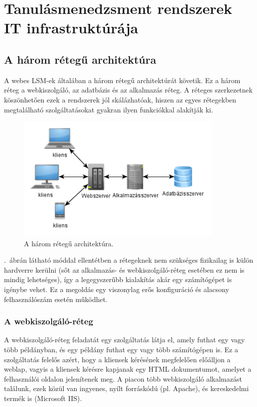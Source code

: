 \chapter{Tanulásmenedzsment rendszerek IT infrastruktúrája}
\section{A három rétegű architektúra}
A webes LSM-ek általában a három rétegű architektúrát követik. Ez a három réteg a webkiszolgáló, az adatbázis és az alkalmazás réteg. A réteges szerkezetnek köszönhetően ezek a rendszerek jól skálázhatóak, hiszen az egyes rétegekben megtalálható szolgáltatásokat gyakran ilyen funkciókkal alakítják ki.

\begin{figure}[!ht]
\centering
\includegraphics[width=100mm, keepaspectratio]{figures/3tier_simple_001.png}
\caption{A három rétegű architektúra.}
\label{fig:3tier_simple_001}
\end{figure}

.~ábrán látható móddal ellentétben a rétegeknek nem szükséges fizikailag is külön hardverre kerülni (sőt az alkalmazás- és webkiszolgáló-réteg esetében ez nem is mindig lehetséges), így a legegyszerűbb kialakítás akár egy számítógépet is igénybe vehet. Ez a megoldás egy viszonylag erős konfiguráció és alacsony felhasználószám esetén működhet.
\subsection{A webkiszolgáló-réteg}
A webkiszolgáló-réteg feladatát egy szolgáltatás látja el, amely futhat egy vagy több példányban, és egy példány futhat egy vagy több számítógépen is. Ez a szolgáltatás felelős azért, hogy a kliensek kérésének megfelelően előálljon a weblap, vagyis a kliensek kérésre kapjanak egy HTML dokumentumot, amelyet a felhasználói oldalon jelenítenek meg.
A piacon több webkiszolgáló alkalmazást találunk, ezek közül van ingyenes, nyílt forráskódú (pl. Apache), és kereskedelmi termék is (Microsoft IIS).

